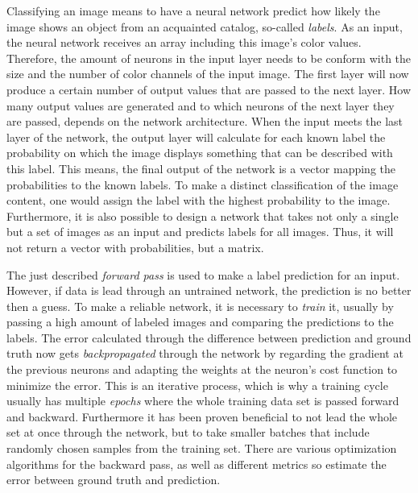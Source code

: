 \documentclass[12pt]{article}
\begin{document}
	
	Classifying an image means to have a neural network predict how likely the image shows an object from an acquainted catalog, so-called \textit{labels}. As an input, the neural network receives an array including this image's color values. Therefore, the amount of neurons in the input layer needs to be conform with the size and the number of color channels of the input image. The first layer will now produce a certain number of output values that are passed to the next layer. How many output values are generated and to which neurons of the next layer they are passed, depends on the network architecture. When the input meets the last layer of the network, the output layer will calculate for each known label the probability on which the image displays something that can be described with this label. This means, the final output of the network is a vector mapping the probabilities to the known labels. To make a distinct classification of the image content, one would assign the label with the highest probability to the image. Furthermore, it is also possible to design a network that takes not only a single but a set of images as an input and predicts labels for all images. Thus, it will not return a vector with probabilities, but a matrix.
	
	The just described \textit{forward pass} is used to make a label prediction for an input. However, if data is lead through an untrained network, the prediction is no better then a guess. To make a reliable network, it is necessary to \textit{train} it, usually by passing a high amount of labeled images and comparing the predictions to the labels. The error calculated through the difference between prediction and ground truth now gets \textit{backpropagated} through the network by regarding the gradient at the previous neurons and adapting the weights at the neuron's cost function to minimize the error. This is an iterative process, which is why a training cycle usually has multiple \textit{epochs} where the whole training data set is passed forward and backward. Furthermore it has been proven beneficial to not lead the whole set at once through the network, but to take smaller batches that include randomly chosen samples from the training set. There are various optimization algorithms for the backward pass, as well as different metrics so estimate the error between ground truth and prediction.
\end{document}
